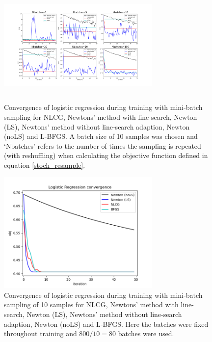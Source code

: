 \documentclass[nohyperref]{article}
\theoremstyle{plain}
\theoremstyle{definition}
\theoremstyle{remark}
\begin{document}
\begin{figure}[!ht]
\centering
\includegraphics[height=6cm, width=8cm]{../src-logistic/stoch_logreg_converge_test_10.png}
\caption{Convergence of logistic regression during training with mini-batch sampling for NLCG, Newtons' method with line-search, Newton (LS),  Newtons' method without line-search adaption,  Newton (noLS) and L-BFGS. A batch size of 10 samples was chosen and `Nbatches' refers to the number of times the sampling is repeated (with reshuffling) when calculating the objective function defined in equation \ref{stoch_resample}.}\label{Stoch_Logistic_regression_conv}
\end{figure}

\begin{figure}[!ht]
\centering
\includegraphics[height=6cm, width=8cm]{../src-logistic/stoch_logreg_converge_test_batch_size_10.png}
\caption{Convergence of logistic regression during training with mini-batch sampling of 10 samples for NLCG, Newtons' method with line-search, Newton (LS),  Newtons' method without line-search adaption,  Newton (noLS) and L-BFGS. Here the batches were fixed throughout training and $800/10=80$ batches were used.}\label{StochFix_Logistic_regression_conv}
\end{figure}
\end{document}
